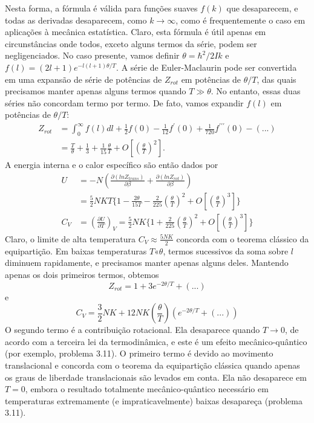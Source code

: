 \documentclass[12pt]{article}
\begin{document}
Nesta forma, a fórmula é válida para funções suaves $f(k)$ que desaparecem, e todas as derivadas desaparecem, como $k \rightarrow \infty$, como é frequentemente o caso em aplicações à mecânica estatística. Claro, esta fórmula é útil apenas em circunstâncias onde todos, exceto alguns termos da série, podem ser negligenciados. No caso presente, vamos definir $ \theta =\hbar^{2}/2Ik$ e $f(l) = (2l+1) e^{-l(l+1)\theta/T}$. A série de Euler-Maclaurin pode ser convertida em uma expansão de série de potências de $Z_{rot}$ em potências de $\theta/T$, das quais precisamos manter apenas alguns termos quando $T \gg \theta$. No entanto, essas duas séries não concordam termo por termo. De fato, vamos expandir $f(l)$ em potências de $\theta/T$:
\begin{align}
Z_{rot} &= \int^{\infty}_{0} f(l)dl + \frac{1}{2}f(0) - \frac{1}{12}f^{\prime}(0) + \frac{1}{720}f^{\prime \prime \prime}(0) - (...) \\
&= \frac{T}{\theta} + \frac{1}{3} + \frac{1}{15}\frac{\theta}{T} + O\left[\left(\frac{\theta}{T} \right)^{2} \right].
\end{align}
A energia interna e o calor específico são então dados por
\begin{align}
    U &= -N\left(\frac{\partial(lnZ_{trans})}{\partial \beta} +\frac{\partial(lnZ_{rot})}{\partial \beta} \right) \\
    &= \frac{5}{2}NKT \biggl\{ 1 - \frac{2 \theta}{15 T} - \frac{2}{225}\left( \frac{\theta}{T}\right)^{2} + O \left[\left(\frac{\theta}{T} \right)^{3} \right] \biggl\}\\
    C_{V} &= \left( \frac{\partial U}{\partial T} \right)_{V} = \frac{5}{2}NK \biggl\{ 1 +  \frac{2}{225}\left( \frac{\theta}{T}\right)^{2} + O \left[\left(\frac{\theta}{T} \right)^{3} \right] \biggl\}
\end{align}
Claro, o limite de alta temperatura $C_{V} \approx \frac{5NK}{2}$ concorda com o teorema clássico da equipartição. Em baixas temperaturas $T « \theta$, termos sucessivos da soma sobre $l$ diminuem rapidamente, e precisamos manter apenas alguns deles. Mantendo apenas os dois primeiros termos, obtemos
\begin{equation}
    Z_{rot} = 1 + 3e^{-2\theta/T}+ ( . . . )
\end{equation}
e
\begin{equation}
    C_{V} = \frac{3}{2}NK + 12NK \left(\frac{\theta}{T}\right)\left(e^{-2\theta/T}+ ( . . . )\right)
\end{equation}
O segundo termo é a contribuição rotacional. Ela desaparece quando $T \to 0$, de acordo com a terceira lei da termodinâmica, e este é um efeito mecânico-quântico (por exemplo, problema 3.11). O primeiro termo é devido ao movimento translacional e concorda com o teorema da equipartição clássica quando apenas os graus de liberdade translacionais são levados em conta. Ela não desaparece em $T = 0$, embora o resultado totalmente mecânico-quântico necessário em temperaturas extremamente (e impraticavelmente) baixas desapareça (problema 3.11).
\end{document}
